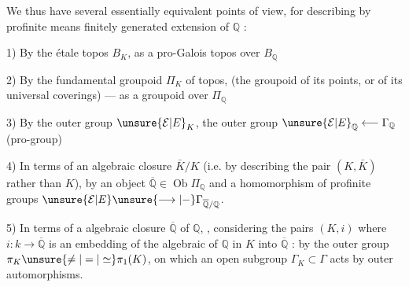 We thus have several essentially equivalent points of view, for describing by profinite means  finitely generated extension  of $\mathbb Q$ :

1) By the étale topos $B_K$, as a pro-Galois topos over $B_{\mathbb Q}$

2) By the fundamental groupoid $\Pi_K$ of  topos, (the groupoid of its points, or of its universal coverings) --- as a groupoid over $\Pi_{\mathbb Q}$

 3) By the outer group $\unsure{\mathcal E|E}_K$,  the outer group $\unsure{\mathcal E|E}_{\mathbb Q}\longleftarrow\Gamma_{\mathbb Q}$ (pro-group)

4) In terms of an algebraic closure $\bar K/K$ (i.e. by describing the pair $(K,\bar K)$ rather than $K$), by an object $\overline{\mathbb Q}\in\operatorname{Ob}\Pi_{\mathbb Q}$\unsure{,|)} and a homomorphism of profinite groups $\unsure{\mathcal E|E}\unsure{\longrightarrow|-}\Gamma_{\overline{\mathbb Q}/\mathbb Q}$.

5) In terms of a  algebraic closure $\overline{\mathbb Q}$ of $\mathbb Q$, ,  considering the pairs $(K,i)$ where $i:k\longrightarrow\overline{\mathbb Q}$ is an embedding of the algebraic   of $\mathbb Q$ in $K$ into $\overline{\mathbb Q}$ :  by the outer group $\pi_K\unsure{\neq|=|\simeq}\pi_1(K)$, on which an open subgroup $\Gamma_K\subset\Gamma$ acts by outer automorphisms.


